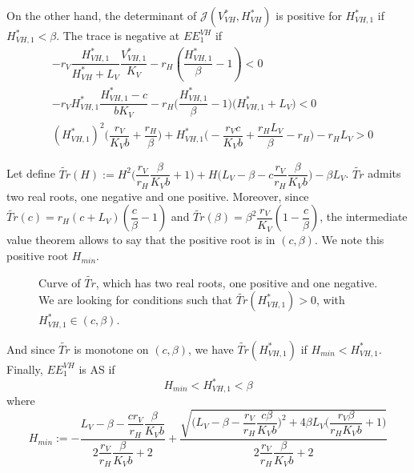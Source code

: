 \documentclass{article}
\begin{document}
\begin{itemize}
On the other hand, the determinant of $\mathcal{J}(V^*_{VH}, H^*_{VH})$ is positive for $H^*_{VH, 1}$ if $H^*_{VH, 1} < \beta$.
The trace is negative at $EE^{VH}_1$  if 
\begin{subequations}
\begin{align}
&-r_V  \dfrac{H^*_{VH, 1}}{H^*_{VH}+L_V}\dfrac{V^*_{VH, 1}}{K_V} - r_H(\dfrac{H^*_{VH, 1}}{\beta} - 1) <0 \\
& -r_V  H^*_{VH, 1} \dfrac{H^*_{VH, 1} - c}{b K_V} - r_H \Big(\dfrac{H^*_{VH, 1}}{\beta} - 1\Big)\Big(H^*_{VH, 1}+L_V \Big) <0 \\
&(H^*_{VH, 1})^2 \Big(\dfrac{r_V}{K_Vb} + \dfrac{r_H}{\beta} \Big) + H^*_{VH, 1} \Big(-\dfrac{r_V c}{K_V	b} + \dfrac{r_H L_V}{\beta} - r_H \Big) - r_H L_V > 0
\end{align}
\end{subequations}

Let define $\tilde{Tr}(H) := H^2\Big(\dfrac{r_V}{r_H}\dfrac{\beta}{K_Vb} + 1 \Big) + H \Big(L_V - \beta - c \dfrac{r_V}{r_H}\dfrac{\beta}{K_V	b}\Big) - \beta L_V$. $\tilde{Tr}$ admits two real roots, one negative and one positive. Moreover, since $\tilde{Tr}(c) = r_H (c+ L_V) (\dfrac{c}{\beta}-1)$ and $\tilde{Tr}(\beta) = \beta^2 \dfrac{r_V}{K_V}(1 - \dfrac{c}{\beta})$, the intermediate value theorem allows to say that the positive root is in $(c, \beta)$. We note this positive root $H_{min}$.

\begin{figure}[ht]
\centering
{}
\caption{\centering Curve of $\tilde{Tr}$, which has two real roots, one positive and one negative. We are looking for conditions such that $\tilde{Tr}(H_{VH,1}^*) > 0$, with $H_{VH,1}^*\in (c, \beta)$. }
\label{fig:Tr tilde}
\end{figure}

And since $\tilde{Tr}$ is monotone on $(c, \beta)$, we have $\tilde{Tr}(H_{VH,1}^*)$ if $H_{min} < H_{VH,1}^*$.
\\

Finally, $EE^{VH}_1$ is AS if 
\begin{equation}
H_{min} < H^*_{VH, 1} < \beta
\end{equation}
where 
\begin{equation}
H_{min} := -\dfrac{L_V - \beta - \dfrac{c r_V}{r_H}\dfrac{\beta}{K_V	b}}{2\dfrac{r_V}{r_H}\dfrac{\beta}{K_Vb} + 2} + \dfrac{\sqrt{\Big(L_V - \beta - \dfrac{r_V}{r_H}\dfrac{c \beta}{K_V	b}\Big)^2 + 4 \beta L_V \Big(\dfrac{r_V\beta}{r_H K_V b} + 1\Big)}}{2\dfrac{r_V}{r_H}\dfrac{\beta}{K_Vb} + 2} 
\label{equilibreVH:Hmin}
\end{equation}
\end{itemize}
\end{document}
